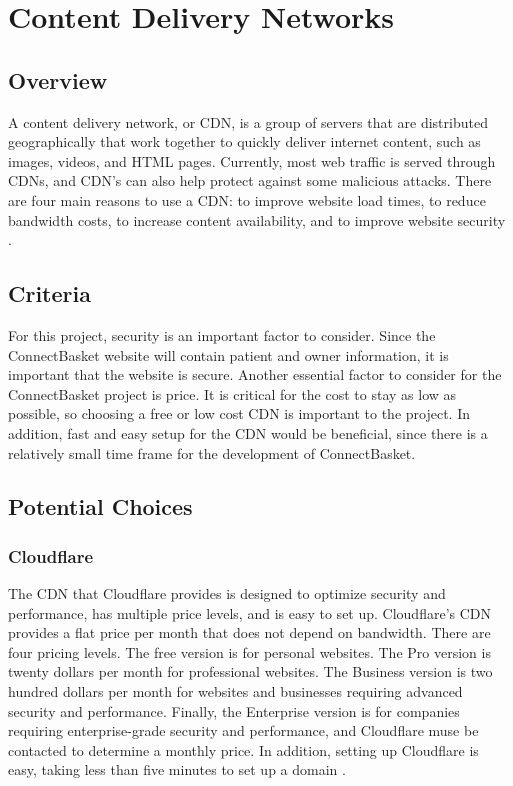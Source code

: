 \documentclass[onecolumn, draftclsnofoot,10pt, compsoc]{IEEEtran}
\begin{document}
\section{Content Delivery Networks}

\subsection{Overview}
A content delivery network, or CDN, is a group of servers that are distributed geographically that work together to quickly deliver internet content, such as images, videos, and HTML pages. Currently, most web traffic is served through CDNs, and CDN's can also help protect against some malicious attacks. There are four main reasons to use a CDN: to improve website load times, to reduce bandwidth costs, to increase content availability, and to improve website security \cite{cdn}. 

\subsection{Criteria}
For this project, security is an important factor to consider. Since the ConnectBasket website will contain patient and owner information, it is important that the website is secure. Another essential factor to consider for the ConnectBasket project is price. It is critical for the cost to stay as low as possible, so choosing a free or low cost CDN is important to the project. In addition, fast and easy setup for the CDN would be beneficial, since there is a relatively small time frame for the development of ConnectBasket.


\subsection{Potential Choices}

\subsubsection{Cloudflare}
The CDN that Cloudflare provides is designed to optimize security and performance, has multiple price levels, and is easy to set up. Cloudflare's CDN provides a flat price per month that does not depend on bandwidth. There are four pricing levels. The free version is for personal websites. The Pro version is twenty dollars per month for professional websites. The Business version is two hundred dollars per month for websites and businesses requiring advanced security and performance. Finally, the Enterprise version is for companies requiring enterprise-grade security and performance, and Cloudflare muse be contacted to determine a monthly price. In addition, setting up Cloudflare is easy, taking less than five minutes to set up a domain \cite{cloudflare}.
\end{document}
